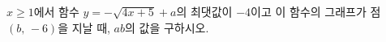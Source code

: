 \hspace*{2mm}\begin{minipage}[t]{\dimexpr\linewidth-2mm\relax}\vspace{0pt}
$x\ge 1$에서 함수 $y=-\sqrt{4x+5}+a$의 최댓값이 $-4$이고 이 함수의 그래프가 점~$(b,\,-6)$을 지날 때, $ab$의 값을 구하시오. \end{minipage}
